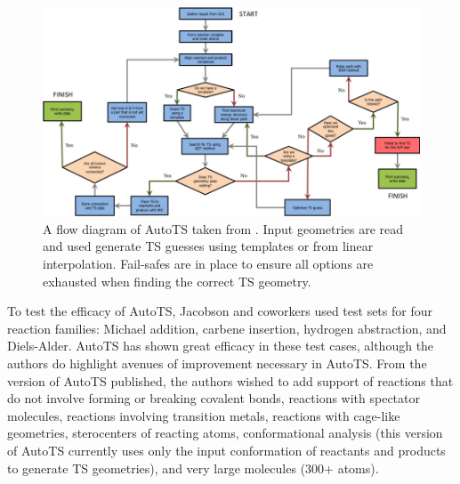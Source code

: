 \documentclass[preprint, 11pt]{elsarticle} %
\begin{document}
\begin{figure}[h!]
\centering
\includegraphics[width=\textwidth]{autots_workflow}
\caption{A flow diagram of AutoTS taken from \cite{jacobson:2017}. Input geometries are read and used generate TS guesses using templates or from linear interpolation. Fail-safes are in place to ensure all options are exhausted when finding the correct TS geometry.}
\label{fig:autots_workflow}
\end{figure}

To test the efficacy of AutoTS, Jacobson and coworkers used test sets for four reaction families: Michael addition, carbene insertion, hydrogen abstraction, and Diels-Alder.
AutoTS has shown great efficacy in these test cases, although the authors do highlight avenues of improvement necessary in AutoTS.
From the version of AutoTS published, the authors wished to add support of reactions that do not involve forming or breaking covalent bonds, reactions with spectator molecules, reactions involving transition metals, reactions with cage-like geometries, sterocenters of reacting atoms, conformational analysis (this version of AutoTS currently uses only the input conformation of reactants and products to generate TS geometries), and very large molecules (300+ atoms).
\end{document}
